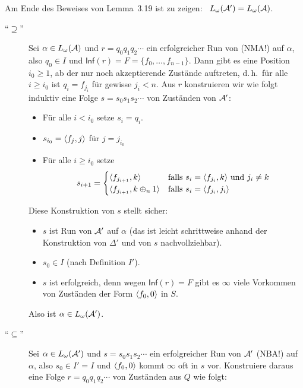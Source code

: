 \documentclass[fontsize=11pt, twoside=false, numbers=autoenddot]{scrbook}
\begin{document}
Am Ende des Beweises von Lemma~3.19 ist zu zeigen:~ $L_\omega(\mathcal{A}') = L_\omega(\mathcal{A})$.
%
\begin{description}
  \item[{\boldmath"`$\supseteq$"'}]
    Sei $\alpha \in L_\omega(\mathcal{A})$ und $r = q_0q_1q_2\cdots$ ein
    erfolgreicher Run von \Amc (NMA!) auf $\alpha$, also $q_0 \in I$
    und $\textsf{Inf}(r) = F = \{f_0,\dots,f_{n-1}\}$.
    Dann gibt es eine Position $i_0 \geq 1$, ab der nur noch
    akzeptierende Zustände auftreten, d.\,h.\ 
    für alle $i \geq i_0$ ist $q_i = f_{j_i}$ für gewisse $j_i < n$.
    Aus $r$ konstruieren wir wie folgt induktiv eine Folge $s=s_0s_1s_2\cdots$ von Zuständen
    von $\mathcal{A}'$:
    \begin{itemize}
      \item
        Für alle $i < i_0$ setze $s_i = q_i$.
      \item
        $s_{i_0} = \langle f_j,j\rangle$ für $j = j_{i_0}$
      \item
        Für alle $i \geq i_0$ setze
        \[
          s_{i+1} = \begin{cases}
                      \langle f_{j_{i+1}}, k \rangle            & \text{falls~} s_i = \langle f_{j_i}, k \rangle \text{~und~} j_i \neq k \\
                      \langle f_{j_{i+1}}, k \oplus_n 1 \rangle & \text{falls~} s_i = \langle f_{j_i}, j_i \rangle
                    \end{cases}
        \]
    \end{itemize}
    Diese Konstruktion von $s$ stellt sicher:
    \begin{itemize}
      \item 
        $s$ ist Run von $\mathcal{A}'$ auf $\alpha$ (das ist leicht schrittweise anhand der Konstruktion von $\Delta'$
        und von $s$ nachvollziehbar).
      \item 
        $s_0 \in I$ (nach Definition $I'$).
      \item 
        $s$ ist erfolgreich, denn wegen $\textsf{Inf}(r) = F$
        gibt es $\infty$ viele Vorkommen von Zuständen der Form $\langle f_0,0\rangle$ in $S$.
    \end{itemize}
    Also ist $\alpha \in L_\omega(\mathcal{A}')$.
  \item[{\boldmath"`$\subseteq$"'}]
    Sei $\alpha \in L_\omega(\mathcal{A}')$ und $s = s_0s_1s_2\cdots$ ein
    erfolgreicher Run von $\mathcal{A}'$ (NBA!) auf $\alpha$, also $s_0 \in I' = I$
    und $\langle f_0,0\rangle$ kommt $\infty$ oft in $s$ vor.
    Konstruiere daraus eine Folge $r = q_0q_1q_2\cdots$ von Zuständen aus $Q$ wie folgt:

\end{description}
\end{document}
